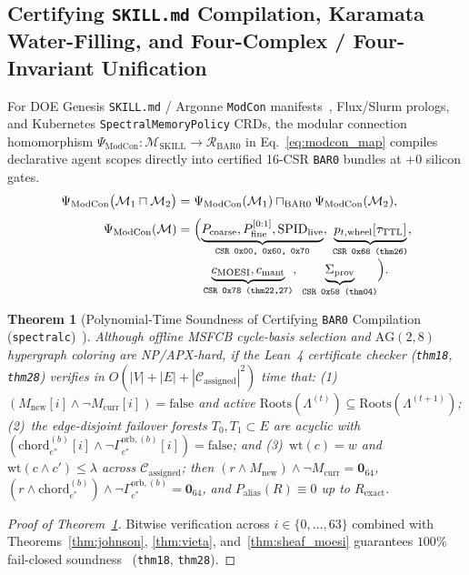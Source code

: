 \documentclass[11pt,letterpaper]{article}
\theoremstyle{spectralthm}
\newtheorem{theorem}{Theorem}[section]
\begin{document}
\subsection{Certifying \texorpdfstring{\texttt{SKILL.md}}{SKILL.md} Compilation, Karamata Water-Filling, and Four-Complex / Four-Invariant Unification}
\label{sec:compiler}
For DOE Genesis \texttt{SKILL.md} / Argonne \texttt{ModCon} manifests~\cite{doe2025genesis}, Flux/Slurm prologs, and Kubernetes \texttt{SpectralMemoryPolicy} CRDs, the modular connection homomorphism $\Psi_{\mathrm{ModCon}} : \mathcal{M}_{\mathrm{SKILL}} \rightarrow \mathcal{R}_{\mathrm{BAR0}}$ in Eq.~\eqref{eq:modcon_map} compiles declarative agent scopes directly into certified 16-CSR \texttt{BAR0} bundles at $+0$ silicon gates.
\begin{equation}
\label{eq:modcon_map}
\begin{aligned}
\Psi_{\mathrm{ModCon}}\bigl(\mathcal{M}_1 \sqcap \mathcal{M}_2\bigr) &= \Psi_{\mathrm{ModCon}}(\mathcal{M}_1) \sqcap_{\mathrm{BAR0}} \Psi_{\mathrm{ModCon}}(\mathcal{M}_2),\\[3pt]
\Psi_{\mathrm{ModCon}}(\mathcal{M}) &= \Bigl(\underbrace{P_{\mathrm{coarse}}, P_{\mathrm{fine}}^{[0:1]}, \mathrm{SPID}_{\mathrm{live}}}_{\texttt{CSR 0x00, 0x60, 0x70}},\; \underbrace{p_{t,\mathrm{wheel}}[\tau_{\mathrm{TTL}}]}_{\texttt{CSR 0x68 (thm26)}},\\[-2pt]
&\phantom{=\Bigl(\;}\underbrace{c_{\mathrm{MOESI}}, c_{\mathrm{mant}}}_{\texttt{CSR 0x78 (thm22,27)}},\; \underbrace{\Sigma_{\mathrm{prov}}}_{\texttt{CSR 0x58 (thm04)}}\Bigr).
\end{aligned}
\end{equation}

\begin{theorem}[Polynomial-Time Soundness of Certifying \texttt{BAR0} Compilation (\texttt{spectralc})~\cite{mcconnell2011certifying}]
\label{thm:compiler}
Although offline MSFCB cycle-basis selection and $\mathrm{AG}(2,8)$ hypergraph coloring are NP/APX-hard, if the Lean~4 certificate checker (\texttt{thm18}, \texttt{thm28}) verifies in $O(|V| + |E| + |\mathcal{C}_{\mathrm{assigned}}|^2)$ time that: (1)~$(M_{\mathrm{new}}[i] \wedge \neg M_{\mathrm{curr}}[i]) = \mathrm{false}$ and active $\mathrm{Roots}(\Lambda^{(t)}) \subseteq \mathrm{Roots}(\Lambda^{(t+1)})$; (2)~the edge-disjoint failover forests $T_0, T_1 \subset E$ are acyclic with $(\mathrm{chord}_{e^*}^{(b)}[i] \wedge \neg\Gamma_{e^*}^{\mathrm{orb},(b)}[i]) = \mathrm{false}$; and (3)~$\mathrm{wt}(c) = w$ and $\mathrm{wt}(c \wedge c') \le \lambda$ across $\mathcal{C}_{\mathrm{assigned}}$; then $(r \wedge M_{\mathrm{new}}) \wedge \neg M_{\mathrm{curr}} = \mathbf{0}_{64}$, $(r \wedge \mathrm{chord}_{e^*}^{(b)}) \wedge \neg\Gamma_{e^*}^{\mathrm{orb},(b)} = \mathbf{0}_{64}$, and $P_{\mathrm{alias}}(R) \equiv 0$ up to $R_{\mathrm{exact}}$.
\end{theorem}
\begin{proof}[Proof of Theorem~\ref{thm:compiler}]
Bitwise verification across $i \in \{0,\ldots,63\}$ combined with Theorems~\ref{thm:johnson}, \ref{thm:vieta}, and~\ref{thm:sheaf_moesi} guarantees $100\%$ fail-closed soundness~\cite{mcconnell2011certifying} (\texttt{thm18}, \texttt{thm28}).
\end{proof}
\end{document}
